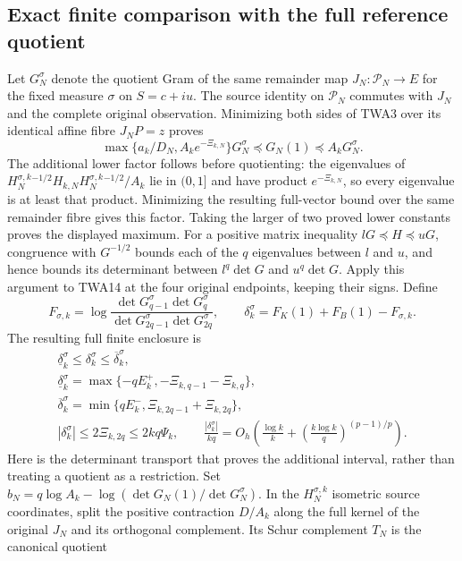 \documentclass[11pt,a4paper]{article}
\begin{document}
\subsection{Exact finite comparison with the full reference quotient}

Let $G_N^\sigma$ denote the quotient Gram of the same remainder
map $J_N:\mathcal P_N\to E$ for the fixed measure $\sigma$ on
$S=c+iu$. The source identity on $\mathcal P_N$ commutes with
$J_N$ and the complete original observation. Minimizing both sides
of TWA3 over its identical affine fibre $J_NP=z$ proves
\[
\max\{a_k/D_N,A_ke^{-\Xi_{k,N}}\}G_N^\sigma
       \preceq G_N(1)\preceq A_kG_N^\sigma.
\tag{TWA14}
\]
The additional lower factor follows before quotienting:
the eigenvalues of $H_N^{\sigma,k}{}^{-1/2}H_{k,N}
H_N^{\sigma,k}{}^{-1/2}/A_k$ lie in $(0,1]$ and have product
$e^{-\Xi_{k,N}}$, so every eigenvalue is at least that product.
Minimizing the resulting full-vector bound over the same
remainder fibre gives this factor. Taking the larger of two
proved lower constants proves the displayed maximum.
For a positive matrix inequality $lG\preceq H\preceq uG$,
congruence with $G^{-1/2}$ bounds each of the $q$ eigenvalues
between $l$ and $u$, and hence bounds its determinant between
$l^q\det G$ and $u^q\det G$. Apply this argument to TWA14
at the four original endpoints, keeping their signs. Define
\[
F_{\sigma,k}=\log\frac{\det G_{q-1}^\sigma\det G_q^\sigma}
{\det G_{2q-1}^\sigma\det G_{2q}^\sigma},\qquad
\delta_k^\sigma=F_K(1)+F_B(1)-F_{\sigma,k}.
\]
The resulting full finite enclosure is
\[
\begin{gathered}
 \underline\delta_k^\sigma\leq\delta_k^\sigma
                         \leq\overline\delta_k^\sigma,\\
 \underline\delta_k^\sigma
 =\max\{-qE_k^+,-\Xi_{k,q-1}-\Xi_{k,q}\},\\
 \overline\delta_k^\sigma
 =\min\{qE_k^-,\Xi_{k,2q-1}+\Xi_{k,2q}\},\\
 |\delta_k^\sigma|\leq2\Xi_{k,2q}\leq2kq\Psi_k,\qquad
 \frac{|\delta_k^\sigma|}{kq}
 =O_h\!\left(\frac{\log k}{k}
       +\left(\frac{k\log k}{q}\right)^{(p-1)/p}\right).
\end{gathered}\tag{TWA15}
\]
Here is the determinant transport that proves the additional
interval, rather than treating a quotient as a restriction.
Set $b_N=q\log A_k-\log(\det G_N(1)/\det G_N^\sigma)$.
In the $H_N^{\sigma,k}$ isometric source coordinates,
split the positive contraction $D/A_k$ along the full kernel
of the original $J_N$ and its orthogonal complement.
Its Schur complement $T_N$ is the canonical quotient
\end{document}
